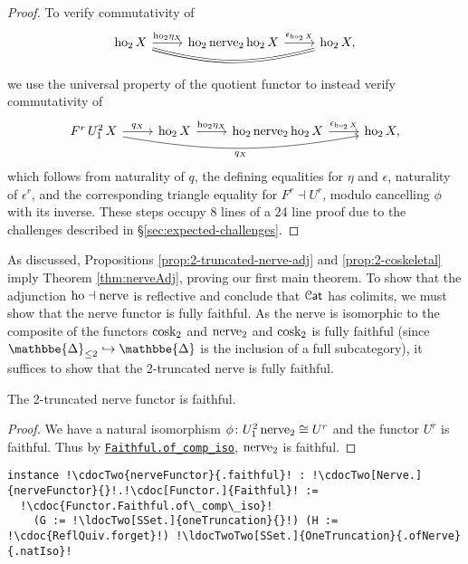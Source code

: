 \documentclass[a4paper,UKenglish,cleveref, autoref, thm-restate]{lipics-v2021}
\newcommand{\op}{\textup{op}}
\newcommand{\cosk}{\textup{cosk}}
\newcommand{\tr}{\textup{tr}}
\newcommand{\ho}{\textup{ho}}
\newcommand{\nerve}{\textup{nerve}}
\newcommand{\cat}[1]{\textup{\textsf{#1}}}%
\newcommand{\1}{\mathbbe{1}}
\newcommand{\2}{\mathbbe{2}}
\newcommand{\3}{\mathbbe{3}}
\newcommand{\DDelta}{\mathbbe{\Delta}}
\newcommand{\Cat}{\mathcal{C}\cat{at}}
\newcommand{\Set}{\mathcal{S}\cat{et}}
\newcommand{\cdoc}[2][]{\href{https://leanprover-community.github.io/mathlib4_docs/find/?pattern=CategoryTheory.#1#2\#doc}{\texttt{#2}}}
\newcommand{\ldocTwo}[3][]{\href{https://leanprover-community.github.io/mathlib4_docs/find/?pattern=#1#2\%E2\%82\%82#3\#doc}{\texttt{#2${}_2$#3}}}
\newcommand{\cdocTwo}[3][]{\href{https://leanprover-community.github.io/mathlib4_docs/find/?pattern=CategoryTheory.#1#2\%E2\%82\%82#3\#doc}{\texttt{#2${}_2$#3}}}
\newcommand{\ldocTwoTwo}[4][]{\href{https://leanprover-community.github.io/mathlib4_docs/find/?pattern=#1#2\%E2\%82\%82#3\%E2\%82\%82#4\#doc}{\texttt{#2${}_2$#3${}_2$#4}}}
\begin{document}
\begin{proof}
To verify commutativity of
\[ \begin{tikzcd} \ho_2\, X \arrow[r, "\ho_2 \eta_X"] \arrow[rr, bend right=15, equals] & \ho_2\,\nerve_2\,\ho_2\,X \arrow[r, "\epsilon_{\ho_2\,X}"] & \ho_2\, X, \end{tikzcd}\] we use the universal property of the quotient functor to instead verify commutativity of
\[ \begin{tikzcd} F^r\,U^2_1\, X \arrow[r, "q_X"] \arrow[rrr, bend right=10, "q_X"'] &  \ho_2\, X \arrow[r, "\ho_2 \eta_X"]  & \ho_2\,\nerve_2\,\ho_2\,X \arrow[r, "\epsilon_{\ho_2\,X}"] & \ho_2\, X,  \end{tikzcd}\] which follows from naturality of $q$, the defining equalities for $\eta$ and $\epsilon$, naturality of $\epsilon^r$, and  the corresponding triangle equality for $F^r \dashv U^r$, modulo cancelling $\phi$ with its inverse. These steps occupy 8 lines of a 24 line proof due to the challenges described in \S\ref{sec:expected-challenges}.
\end{proof}

As discussed, Propositions \ref{prop:2-truncated-nerve-adj} and \ref{prop:2-coskeletal} imply Theorem \ref{thm:nerveAdj}, proving our first main theorem. To show that the adjunction $\ho \dashv \nerve$ is reflective and conclude that $\Cat$ has colimits, we must show that the nerve functor is fully faithful. As the nerve is isomorphic to the composite of the functors $\cosk_2$ and $\nerve_2$ and $\cosk_2$ is fully faithful (since $\DDelta_{\leq 2} \hookrightarrow \DDelta$ is the inclusion of a full subcategory), it suffices to show that the 2-truncated nerve is fully faithful.

\begin{lemma}[\cdocTwo{nerveFunctor}{.faithful}]
  The 2-truncated nerve functor is faithful.
\end{lemma}
\begin{proof}
  We have a natural isomorphism $\phi \colon U_1^2\, \nerve_2 \cong U^r$ and the functor $U^r$ is faithful. Thus by \cdoc[Functor.]{Faithful.of\_comp\_iso}, $\nerve_2$ is faithful.
\end{proof}
\begin{lstlisting}
instance !\cdocTwo{nerveFunctor}{.faithful}! : !\cdocTwo[Nerve.]{nerveFunctor}{}!.!\cdoc[Functor.]{Faithful}! :=
  !\cdoc{Functor.Faithful.of\_comp\_iso}!
    (G := !\ldocTwo[SSet.]{oneTruncation}{}!) (H := !\cdoc{ReflQuiv.forget}!) !\ldocTwoTwo[SSet.]{OneTruncation}{.ofNerve}{.natIso}!
\end{lstlisting}
\end{document}
